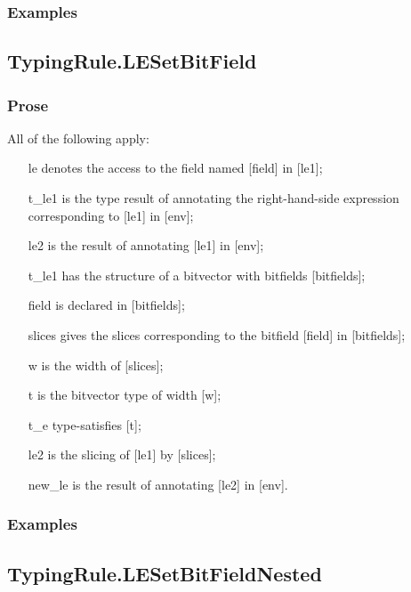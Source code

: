 \documentclass{book}
\begin{document}
    \subsubsection{Examples}

\subsection{TypingRule.LESetBitField}

    \subsubsection{Prose}
    All of the following apply:
   \begin{itemize}
   \item [le] denotes the access to the field named [field] in [le1];
   \item [t\_le1] is the type result of annotating the right-hand-side expression corresponding to [le1] in [env];
   \item [le2] is the result of annotating [le1] in [env];
   \item [t\_le1] has the structure of a bitvector with bitfields [bitfields];
   \item [field] is declared in [bitfields];
   \item [slices] gives the slices corresponding to the bitfield [field] in
      [bitfields];
   \item [w] is the width of [slices];
   \item [t] is the bitvector type of width [w];
   \item [t\_e] type-satisfies [t];
   \item [le2] is the slicing of [le1] by [slices];
   \item [new\_le] is the result of annotating [le2] in [env].
   \end{itemize}

    \subsubsection{Examples}

\subsection{TypingRule.LESetBitFieldNested}
\end{document}
